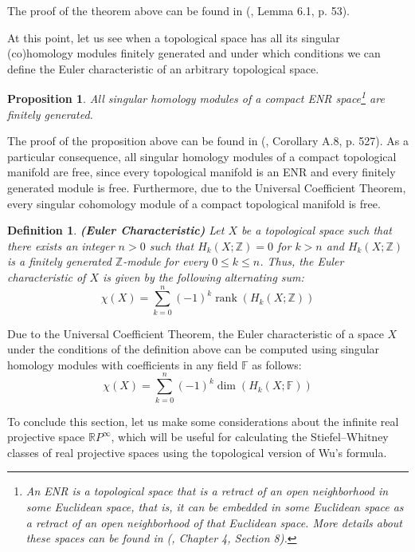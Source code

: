 \documentclass[12pt,oneside]{book}
\newtheorem{defi}   {Definition}[chapter]
\newtheorem{prop}   {Proposition}[chapter]
\newcommand{\ds}{\displaystyle}
\newcommand{\RP}{\mathbb{R}P}
\newcommand{\Z}{\mathbb{Z}}
\newcommand{\F}{\mathbb{F}}
\begin{document}
    The proof of the theorem above can be found in (\cite{alex}, Lemma 6.1, p. 53).
    
    At this point, let us see when a topological space has all its singular (co)homology modules finitely generated and under which conditions 
    we can define the Euler characteristic of an arbitrary topological space.
    
    \begin{prop}
        All singular homology modules of a compact ENR space\footnote{An ENR is a topological space that is a retract of an open 
        neighborhood in some Euclidean space, that is, it can be embedded in some Euclidean space as a retract of an open neighborhood of that 
        Euclidean space. More details about these spaces can be found in (\cite{dold}, Chapter 4, Section 8).} are finitely 
        generated.
    \end{prop}
    
    The proof of the proposition above can be found in (\cite{hatcher}, Corollary A.8, p. 527). As a particular consequence, all singular 
    homology modules of a compact topological manifold are free, since every topological manifold is an ENR and 
    every finitely generated module is free. Furthermore, due to the Universal Coefficient Theorem, every singular 
    cohomology module of a compact topological manifold is free.
    
    \begin{defi}{\bf (Euler Characteristic)}
        Let $X$ be a topological space such that there exists an integer $n>0$ such that $H_{k}(X;\Z)=0$ for $k>n$ and $H_{k}(X;\Z)$ is a 
        finitely generated $\Z$-module for every $0\leq k\leq n$. Thus, the Euler characteristic of $X$ is given 
        by the following alternating sum:
        $$ \chi(X)=\ds\sum_{k=0}^{n}(-1)^{k}\operatorname{rank}(H_{k}(X;\Z)) $$
    \end{defi}
    
    Due to the Universal Coefficient Theorem, the Euler characteristic of a space $X$ under the 
    conditions of the definition above can be computed using singular homology modules with coefficients in any field $\F$ as follows:
    $$ \chi(X)=\ds\sum_{k=0}^{n}(-1)^{k}\dim(H_{k}(X;\F)) $$
    
    To conclude this section, let us make some considerations about the infinite real projective space 
    $\RP^{\infty}$, which will be useful for calculating the Stiefel–Whitney classes of real projective spaces 
    using the topological version of Wu's formula.
    
\end{document}
